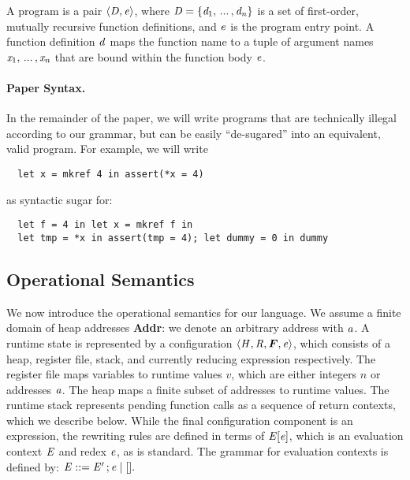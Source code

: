 A program is a pair $ \left\langle{ \mathit{D} ,  \mathit{e} }\right\rangle $, where
$\mathit{D}  =  \{  \mathit{d_{{\mathrm{1}}}}  , \, ... \, ,  \mathit{d_{\mathit{n}}}  \}$ is a set of first-order, mutually recursive function definitions, and $\mathit{e}$
is the program entry point. A function definition $\mathit{d}$
maps the function name to a tuple of argument names $\mathit{x_{{\mathrm{1}}}}  , \, ... \, ,  \mathit{x_{\mathit{n}}}$
that are
bound within the function body $\mathit{e}$.

\paragraph{Paper Syntax.}
In the remainder of the paper, we will write programs that
are technically illegal according to our grammar, but can be
easily ``de-sugared'' into an equivalent, valid program.
For example, we will write
\begin{lstlisting}
  let x = mkref 4 in assert(*x = 4)
\end{lstlisting}
as syntactic sugar for:
\begin{lstlisting}
  let f = 4 in let x = mkref f in
  let tmp = *x in assert(tmp = 4); let dummy = 0 in dummy
\end{lstlisting}




\subsection{Operational Semantics}
\label{sec:semantics}
We now introduce the operational semantics for our language.
We assume a finite domain of heap addresses \textbf{Addr}:
we denote an arbitrary address with $\mathit{a}$.
A runtime state is represented by a configuration $ \tuple{ \ottnt{H} ,  \ottnt{R} ,  \oldvec{F} ,  \ottnt{e} } $, which consists of a heap,
register file, stack, and currently reducing expression respectively.
The register file maps variables to runtime values $v$, which are
either integers $n$ or addresses $\mathit{a}$. The heap maps a finite subset
of addresses to runtime values. The runtime stack represents pending
function calls as a sequence of return contexts, which we
describe below.
While the final configuration component is an expression,
the rewriting rules are defined in terms of $\mathit{E}  [  \mathit{e}  ]$, which is
an evaluation context $\mathit{E}$ and redex $\mathit{e}$, as is standard.
The grammar for evaluation contexts is defined by: 
\(
    \mathit{E}  ::=   \mathit{E'} \operatorname{;} \mathit{e}  \mid  [] .
  \)

